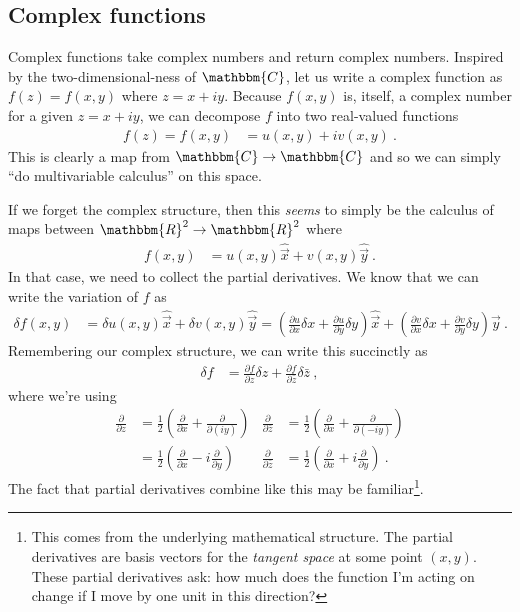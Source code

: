\subsection{Complex functions}

Complex functions take complex numbers and return complex numbers. Inspired by the two-dimensional-ness of $\mathbbm{C}$, let us write a complex function as $f(z)=f(x,y)$ where $z = x+i y$. Because $f(x,y)$ is, itself, a complex number for a given $z=x+i y$, we can decompose $f$ into two real-valued functions
\begin{align}
	f(z) = f(x,y) &= u(x,y) + i v(x,y) \ .
\end{align}
This is clearly a map from $\mathbbm{C} \to \mathbbm{C}$ and so we can simply ``do multivariable calculus'' on this space. 

If we forget the complex structure, then this \emph{seems} to simply be the calculus of maps between $\mathbbm{R}^2 \to \mathbbm{R}^2$ where
\begin{align}
	f(x,y) &= u(x,y) \hat{\vec{x}} + v(x,y)\hat{\vec{y}} \ .
\end{align}
In that case, we need to collect the partial derivatives. We know that we can write the variation of $f$ as
\begin{align}
\delta f(x,y) &= \delta u(x,y) \hat{\vec{x}} + \delta v(x,y)\hat{\vec{y}} 
=
\left(
	\frac{\partial u}{\partial x}\delta x +
	\frac{\partial u}{\partial y}\delta y
\right)\hat{\vec{x}}+
\left(
	\frac{\partial v}{\partial x}\delta x +
	\frac{\partial v}{\partial y}\delta y
\right)\hat{\vec{y}} \ .
\end{align}
Remembering our complex structure, we can write this succinctly as
\begin{align}
	\delta f &= 
	\frac{\partial f}{\partial z}\delta z +
	\frac{\partial f}{\partial \bar z}\delta \bar z \ ,
	\label{eq:complex:2D:deviation}
\end{align}
where we're using
\begin{align}
	\frac{\partial}{\partial z} &= 
	\frac{1}{2}
	\left(
	\frac{\partial}{\partial x}
	+
	\frac{\partial}{\partial (iy)}
	\right)
	&
	\frac{\partial}{\partial \bar z} &= 
	\frac{1}{2}
	\left(
	\frac{\partial}{\partial x}
	+
	\frac{\partial}{\partial (-iy)}
	\right) 
	\\
	&=
	\frac{1}{2}
	\left(
	\frac{\partial}{\partial x}
	-i
	\frac{\partial}{\partial y}
	\right)
	&
	\frac{\partial}{\partial \bar z} &= 
	\frac{1}{2}
	\left(
	\frac{\partial}{\partial x}
	+i
	\frac{\partial}{\partial y}
	\right) 
	\ .
	\label{eq:ddz:ddzst}
\end{align}
The fact that partial derivatives combine like this may be familiar\footnote{This comes from the underlying mathematical structure. The partial derivatives are basis vectors for the \emph{tangent space} at some point $(x,y)$. These partial derivatives ask: how much does the function I'm acting on change if I move by one unit in this direction?}. 

